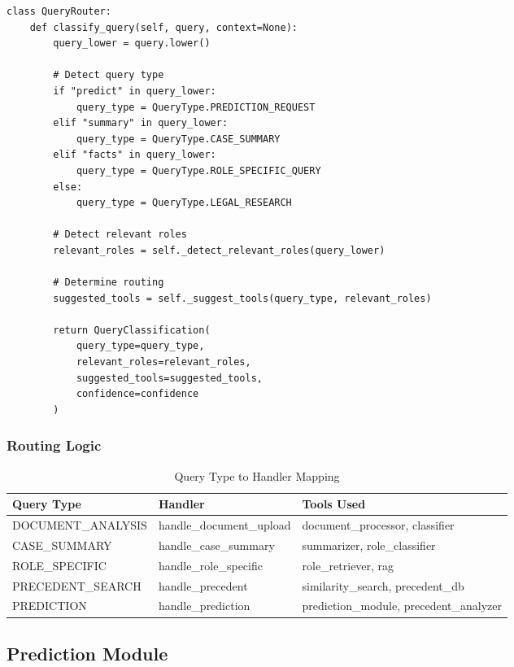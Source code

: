 \documentclass[12pt,a4paper]{article}
\begin{document}
\begin{lstlisting}[caption={Query Router Implementation}]
class QueryRouter:
    def classify_query(self, query, context=None):
        query_lower = query.lower()
        
        # Detect query type
        if "predict" in query_lower:
            query_type = QueryType.PREDICTION_REQUEST
        elif "summary" in query_lower:
            query_type = QueryType.CASE_SUMMARY
        elif "facts" in query_lower:
            query_type = QueryType.ROLE_SPECIFIC_QUERY
        else:
            query_type = QueryType.LEGAL_RESEARCH
        
        # Detect relevant roles
        relevant_roles = self._detect_relevant_roles(query_lower)
        
        # Determine routing
        suggested_tools = self._suggest_tools(query_type, relevant_roles)
        
        return QueryClassification(
            query_type=query_type,
            relevant_roles=relevant_roles,
            suggested_tools=suggested_tools,
            confidence=confidence
        )
\end{lstlisting}

\subsubsection{Routing Logic}

\begin{table}[H]
\centering
\begin{tabular}{|l|l|l|}
\hline
\textbf{Query Type} & \textbf{Handler} & \textbf{Tools Used} \\
\hline
DOCUMENT\_ANALYSIS & handle\_document\_upload & document\_processor, classifier \\
CASE\_SUMMARY & handle\_case\_summary & summarizer, role\_classifier \\
ROLE\_SPECIFIC & handle\_role\_specific & role\_retriever, rag \\
PRECEDENT\_SEARCH & handle\_precedent & similarity\_search, precedent\_db \\
PREDICTION & handle\_prediction & prediction\_module, precedent\_analyzer \\
\hline
\end{tabular}
\caption{Query Type to Handler Mapping}
\end{table}

\subsection{Prediction Module}
\end{document}
